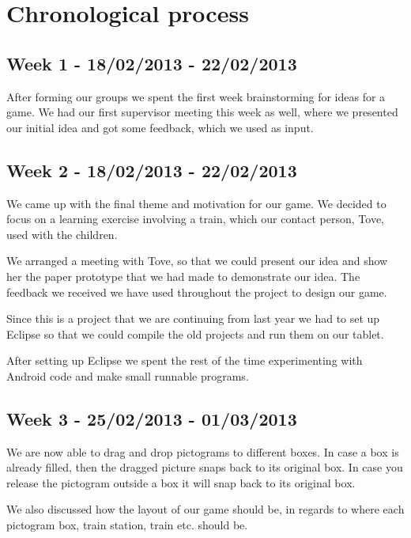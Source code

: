 \chapter{Chronological process}
\label{chronologicalprocess}


\section*{Week 1 - 18/02/2013 - 22/02/2013}

After forming our groups we spent the first week brainstorming for ideas for a game. We had our first supervisor meeting this week as well, where we presented our initial idea and got some feedback, which we used as input. 

\section*{Week 2 - 18/02/2013 - 22/02/2013} 

We came up with the final theme and motivation for our game. We decided to focus on a learning exercise involving a train, which our contact person, Tove, used with the children. 

We arranged a meeting with Tove, so that we could present our idea and show her the paper prototype that we had made to demonstrate our idea. The feedback we received we have used throughout the project to design our game. 

Since this is a project that we are continuing from last year we had to set up Eclipse so that we could compile the old projects and run them on our tablet. 

After setting up Eclipse we spent the rest of the time experimenting with Android code and make small runnable programs. 

\section*{Week 3 - 25/02/2013 - 01/03/2013}

We are now able to drag and drop pictograms to different boxes. In case a box is already filled, then the dragged picture snaps back to its original box. In case you release the pictogram outside a box it will snap back to its original box. 

We also discussed how the layout of our game should be, in regards to where each pictogram box, train station, train etc. should be. 


